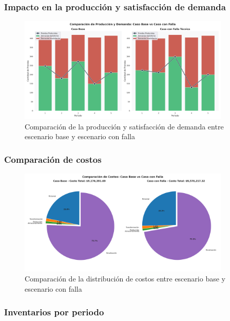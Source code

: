 \subsubsection*{Impacto en la producción y satisfacción de demanda}

\begin{figure}[H]
    \centering
    \includegraphics[width=0.9\textwidth]{resources/pregunta3/grafico_comparativo_produccion_demanda.png}
    \caption{Comparación de la producción y satisfacción de demanda entre escenario base y escenario con falla}
    \label{fig:comparativa_produccion}
\end{figure}

\subsubsection*{Comparación de costos}

\begin{figure}[H]
    \centering
    \includegraphics[width=0.9\textwidth]{resources/pregunta3/grafico_comparativo_costos.png}
    \caption{Comparación de la distribución de costos entre escenario base y escenario con falla}
    \label{fig:comparativa_costos}
\end{figure}

\subsubsection*{Inventarios por periodo}

